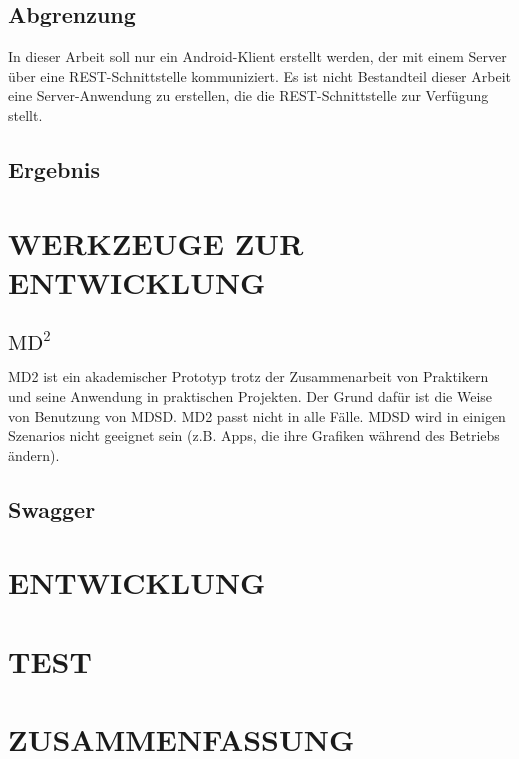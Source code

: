 \documentclass[a4paper,twoside]{article}
\begin{document}
\subsection{Abgrenzung}
In dieser Arbeit soll nur ein Android-Klient erstellt werden, der mit einem Server \"uber eine REST-Schnittstelle kommuniziert. Es ist nicht Bestandteil dieser Arbeit eine Server-Anwendung zu erstellen, die die REST-Schnittstelle zur Verf\"ugung stellt.\\

\subsection{Ergebnis}


\section{\uppercase{Werkzeuge zur Entwicklung}}

\subsection{$\text{MD}^2$}
MD2 ist ein akademischer Prototyp trotz der Zusammenarbeit von  
Praktikern und seine Anwendung in praktischen Projekten. Der Grund 
dafür ist die Weise von Benutzung von MDSD. MD2 passt nicht in alle Fälle. MDSD wird in einigen Szenarios nicht geeignet sein (z.B. Apps, die ihre Grafiken während des Betriebs ändern).
\cite{MDCP2015}

\subsection{Swagger}

\section{\uppercase{Entwicklung}}

\section{\uppercase{Test}}

\section{\uppercase{Zusammenfassung}}



\small

\end{document}
